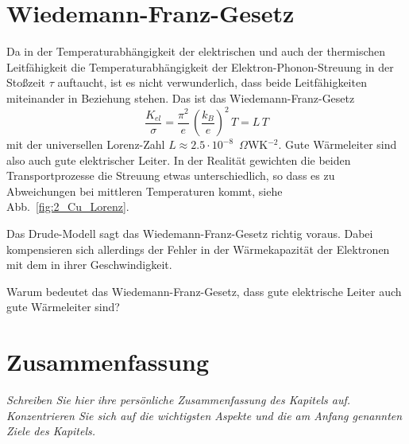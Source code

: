 \section{Wiedemann-Franz-Gesetz}

Da in der Temperaturabhängigkeit der elektrischen und auch der thermischen Leitfähigkeit die Temperaturabhängigkeit der Elektron-Phonon-Streuung in der Stoßzeit $\tau$ auftaucht, ist es nicht verwunderlich, dass beide Leitfähigkeiten miteinander in Beziehung stehen. Das ist das Wiedemann-Franz-Gesetz
\begin{equation}
   \frac{K_{el}}{\sigma} = \frac{\pi^2}{e} \, \left( \frac{k_B}{e} \right)^2 \, T = L \, T
\end{equation}
mit der universellen Lorenz-Zahl $L \approx 2.5 \cdot 10^{-8}$~$\Omega$WK$^{-2}$. Gute Wärmeleiter sind also auch gute elektrischer Leiter. In der Realität gewichten die beiden Transportprozesse die Streuung etwas unterschiedlich, so dass es zu Abweichungen bei mittleren Temperaturen kommt, siehe Abb.~\ref{fig:2_Cu_Lorenz}.

Das Drude-Modell sagt das Wiedemann-Franz-Gesetz richtig voraus. Dabei kompensieren sich allerdings der Fehler in der Wärmekapazität der Elektronen mit dem in ihrer Geschwindigkeit.

\begin{questions}
    \item  Warum bedeutet das Wiedemann-Franz-Gesetz, dass gute elektrische Leiter auch gute Wärmeleiter sind? 
\end{questions}


\newpage
\section{Zusammenfassung}

\textit{Schreiben Sie hier ihre persönliche Zusammenfassung des Kapitels auf. Konzentrieren Sie sich auf die wichtigsten Aspekte und die am Anfang genannten Ziele des Kapitels.}

 \vspace*{10cm}

\printbibliography[segment=\therefsegment,heading=subbibliography]
